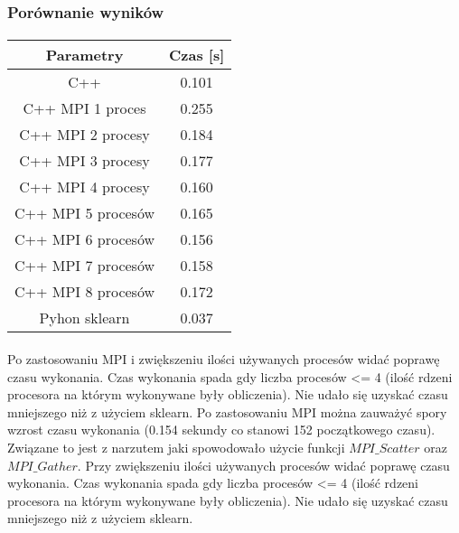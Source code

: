\documentclass[a4paper,11pt]{article}
\begin{document}
\subsubsection{Porównanie wyników} 
\paragraph{}
\begin{tabular}{|c|c|}
\hline Parametry&Czas [s] \\ 
\hline C++ & 0.101 \\
\hline C++ MPI 1 proces& 0.255 \\
\hline C++ MPI 2 procesy& 0.184 \\
\hline C++ MPI 3 procesy& 0.177 \\
\hline C++ MPI 4 procesy& 0.160 \\
\hline C++ MPI 5 procesów& 0.165 \\
\hline C++ MPI 6 procesów& 0.156 \\
\hline C++ MPI 7 procesów& 0.158 \\
\hline C++ MPI 8 procesów& 0.172 \\
\hline
\hline Pyhon sklearn& 0.037 \\
\hline
\end{tabular}
\paragraph{}
Po zastosowaniu MPI i zwiększeniu ilości używanych procesów widać poprawę czasu wykonania. Czas wykonania spada gdy liczba procesów <= 4 (ilość rdzeni procesora na którym wykonywane były obliczenia). Nie udało się uzyskać czasu mniejszego niż z użyciem sklearn.
Po zastosowaniu MPI można zauważyć spory wzrost czasu wykonania (0.154 sekundy co stanowi 152 początkowego czasu). Związane to jest z narzutem jaki spowodowało użycie funkcji $MPI\_Scatter$ oraz $MPI\_Gather$. Przy zwiększeniu ilości używanych procesów widać poprawę czasu wykonania. Czas wykonania spada gdy liczba procesów <= 4 (ilość rdzeni procesora na którym wykonywane były obliczenia). Nie udało się uzyskać czasu mniejszego niż z użyciem sklearn.
\\
\end{document}
